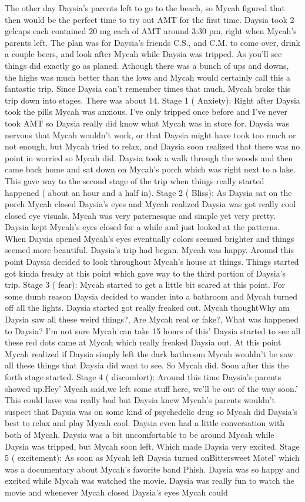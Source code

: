 \documentclass[12pt]{book}
\begin{document}
The other day Daysia's parents left to go to the beach, so Mycah figured that then would be the perfect time to try out AMT for the first time. Daysia took 2 gelcaps each contained 20 mg each of AMT around 3:30 pm, right when Mycah's parents left. The plan was for Daysia's friends C.S., and C.M. to come over, drink a couple beers, and look after Mycah while Daysia was tripped. As you'll see things did exactly go as planed. Athough there was a bunch of ups and downs, the highs was much better than the lows and Mycah would certainly call this a fantastic trip. Since Daysia can't remember times that much, Mycah broke this trip down into stages. There was about 14. Stage 1 ( Anxiety): Right after Daysia took the pills Mycah was anxious. I've only tripped once before and I've never took AMT so Daysia really did know what Mycah was in store for. Daysia was nervous that Mycah wouldn't work, or that Daysia might have took too much or not enough, but Mycah tried to relax, and Daysia soon realized that there was no point in worried so Mycah did. Daysia took a walk through the woods and then came back home and sat down on Mycah's porch which was right next to a lake. This gave way to the second stage of the trip when things really started happened ( about an hour and a half in). Stage 2 ( Bliss): As Daysia sat on the porch Mycah closed Daysia's eyes and Mycah realized Daysia was got really cool closed eye visuals. Mycah was very paternesque and simple yet very pretty. Daysia kept Mycah's eyes closed for a while and just looked at the patterns. When Daysia opened Mycah's eyes eventually colors seemed brighter and things seemed more beautiful. Daysia's trip had began. Mycah was happy. Around this point Daysia decided to look throughout Mycah's house at things. Things started got kinda freaky at this point which gave way to the third portion of Daysia's trip. Stage 3 ( fear): Mycah started to get a little bit scared at this point. For some dumb reason Daysia decided to wander into a bathroom and Mycah turned off all the lights. Daysia started got really freaked out. Mycah thoughtWhy am Daysia saw all these weird things?, Are Mycah real or fake?, What was happened to Daysia? I'm not sure Mycah can take 15 hours of this' Daysia started to see all these red dots came at Mycah which really freaked Daysia out. At this point Mycah realized if Daysia simply left the dark bathroom Mycah wouldn't be saw all these things that Daysia did want to see. So Mycah did. Soon after this the forth stage started. Stage 4 ( discomfort): Around this time Daysia's parents showed up.Hey' Mycah said,we left some stuff here, we'll be out of the way soon.' This could have was really bad but Daysia knew Mycah's parents wouldn't suspect that Daysia was on some kind of psychedelic drug so Mycah did Daysia's best to relax and play Mycah cool. Daysia even had a little conversation with both of Mycah. Daysia was a bit uncomfortable to be around Mycah while Daysia was tripped, but Mycah soon left. Which made Daysia very excited. Stage 5 ( excitement): As soon as Mycah left Daysia turned onBittersweet Motel' which was a documentary about Mycah's favorite band Phish. Daysia was so happy and excited while Mycah was watched the movie. Daysia was really fun to watch the movie and whenever Mycah closed Daysia's eyes Mycah could 
\end{document}

